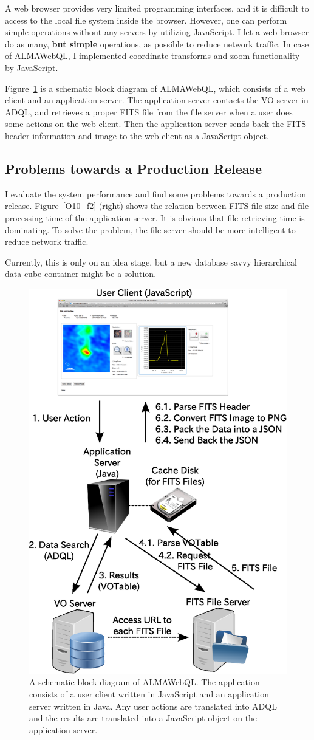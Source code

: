 A web browser provides very limited programming interfaces, and it is difficult to access to
the local file system inside the browser.
However, one can perform simple operations without any servers by utilizing  JavaScript.
I let a web browser do as many, {\bf but simple} operations, as possible to reduce network
traffic.
In case of ALMAWebQL, I implemented coordinate transforms and zoom functionality by
JavaScript.

Figure~\ref{O10_f3} is a schematic block diagram of ALMAWebQL, which consists of a web
client and an application server.
The application server contacts the VO server in ADQL, and retrieves a proper FITS file
from the file server when a user does some actions on the web client.
Then the application server sends back the FITS header information and image to the
web client as a JavaScript object.

\subsection{Problems towards a Production Release}

I evaluate the system performance and find some problems towards a production release.
Figure~\ref{O10_f2} (right) shows the relation between FITS file size and file processing time
of the application server.
It is obvious that file retrieving time is dominating.
To solve the problem, the file server should be more intelligent to reduce network
traffic.

Currently, this is only on an idea stage, but a new database savvy hierarchical data
cube container might be a solution.


\begin{figure}[tbh]
	\begin{center}
		\includegraphics[keepaspectratio,width=0.54\hsize,clip]{part9/Eguchi_O10/O10_f3.eps}
	\end{center}
	\caption{A schematic block diagram of ALMAWebQL. The application consists of
	a user client written in JavaScript and an application server written in Java. Any user actions
	are translated into ADQL and the results are translated into a JavaScript object on the application
	server.\label{O10_f3}}
\end{figure}%

